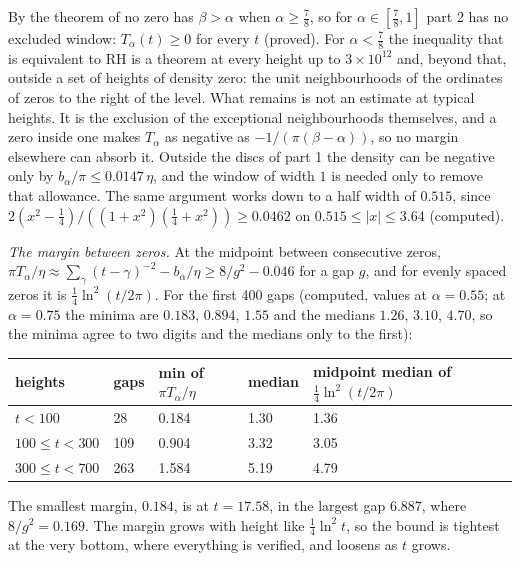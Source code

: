 By the theorem of \cite{OAI26a} no zero has $\beta>\alpha$ when $\alpha\ge\frac78$, so for $\alpha\in[\frac78,1]$ part 2 has no excluded window: $T_\alpha(t)\ge0$ for every $t$ (proved). For $\alpha<\frac78$ the inequality that is equivalent to RH is a theorem at every height up to $3\times10^{12}$ and, beyond that, outside a set of heights of density zero: the unit neighbourhoods of the ordinates of zeros to the right of the level. What remains is not an estimate at typical heights. It is the exclusion of the exceptional neighbourhoods themselves, and a zero inside one makes $T_\alpha$ as negative as $-1/(\pi(\beta-\alpha))$, so no margin elsewhere can absorb it. Outside the discs of part 1 the density can be negative only by $b_\alpha/\pi\le0.0147\,\eta$, and the window of width $1$ is needed only to remove that allowance. The same argument works down to a half width of $0.515$, since $2(x^2-\frac14)/((1+x^2)(\frac14+x^2))\ge0.0462$ on $0.515\le|x|\le3.64$ (computed).

\emph{The margin between zeros.} At the midpoint between consecutive zeros, $\pi T_\alpha/\eta\approx\sum_\gamma(t-\gamma)^{-2}-b_\alpha/\eta\ge8/g^2-0.046$ for a gap $g$, and for evenly spaced zeros it is $\frac14\ln^2(t/2\pi)$. For the first 400 gaps (computed, values at $\alpha=0.55$; at $\alpha=0.75$ the minima are $0.183$, $0.894$, $1.55$ and the medians $1.26$, $3.10$, $4.70$, so the minima agree to two digits and the medians only to the first):
\begin{center}
\small
\begin{tabular}{lllll}
\toprule
heights & gaps & min of $\pi T_\alpha/\eta$ & median & midpoint median of $\frac14\ln^2(t/2\pi)$\\
\midrule
$t<100$ & 28 & 0.184 & 1.30 & 1.36\\
$100\le t<300$ & 109 & 0.904 & 3.32 & 3.05\\
$300\le t<700$ & 263 & 1.584 & 5.19 & 4.79\\
\bottomrule
\end{tabular}
\end{center}
The smallest margin, $0.184$, is at $t=17.58$, in the largest gap $6.887$, where $8/g^2=0.169$. The margin grows with height like $\frac14\ln^2t$, so the bound is tightest at the very bottom, where everything is verified, and loosens as $t$ grows.


